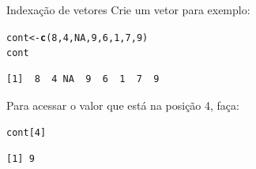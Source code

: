 \documentclass[10pt,handout]{beamer}\usepackage[]{graphicx}\usepackage[]{color}
\makeatletter
\newcommand{\hlnum}[1]{\textcolor[rgb]{0.686,0.059,0.569}{#1}}%
\newcommand{\hlstd}[1]{\textcolor[rgb]{0.345,0.345,0.345}{#1}}%
\newcommand{\hlkwb}[1]{\textcolor[rgb]{0.69,0.353,0.396}{#1}}%
\newcommand{\hlkwd}[1]{\textcolor[rgb]{0.282,0.239,0.545}{\textbf{#1}}}%
\newenvironment{kframe}{%
 \def\at@end@of@kframe{}%
 \ifinner\ifhmode%
  \def\at@end@of@kframe{\end{minipage}}%
  \begin{minipage}{\columnwidth}%
 \fi\fi%
 \def\FrameCommand##1{\hskip\@totalleftmargin \hskip-\fboxsep
 \colorbox{shadecolor}{##1}\hskip-\fboxsep
     \hskip-\linewidth \hskip-\@totalleftmargin \hskip\columnwidth}%
 \MakeFramed {\advance\hsize-\width
   \@totalleftmargin\z@ \linewidth\hsize
   \@setminipage}}%
 {\par\unskip\endMakeFramed%
 \at@end@of@kframe}
\newenvironment{knitrout}{}{} %
\makeatother
\begin{document}
\begin{frame}[fragile]{Indexação de vetores}
Crie um vetor para exemplo:
\begin{knitrout}\small
{}\color{fgcolor}\begin{kframe}
\begin{alltt}
\hlstd{cont} \hlkwb{<-} \hlkwd{c}\hlstd{(}\hlnum{8}\hlstd{,} \hlnum{4}\hlstd{,} \hlnum{NA}\hlstd{,} \hlnum{9}\hlstd{,} \hlnum{6}\hlstd{,} \hlnum{1}\hlstd{,} \hlnum{7}\hlstd{,} \hlnum{9}\hlstd{)}
\hlstd{cont}
\end{alltt}
\begin{verbatim}
[1]  8  4 NA  9  6  1  7  9
\end{verbatim}
\end{kframe}
\end{knitrout}

Para acessar o valor que está na posição 4, faça:
\begin{knitrout}\small
{}\color{fgcolor}\begin{kframe}
\begin{alltt}
\hlstd{cont[}\hlnum{4}\hlstd{]}
\end{alltt}
\begin{verbatim}
[1] 9
\end{verbatim}
\end{kframe}
\end{knitrout}

\begin{center}
\end{center}
\end{frame}
\end{document}
